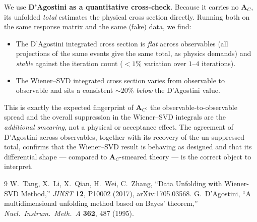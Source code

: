 \documentclass[11pt]{article}
\newcommand{\AC}{\mathbf{A}_C}
\begin{document}
We use \textbf{D'Agostini as a quantitative cross-check}. Because it carries no $\AC$,
its unfolded \emph{total} estimates the physical cross section directly. Running both on
the same response matrix and the same (fake) data, we find:
\begin{itemize}[noitemsep]
  \item The D'Agostini integrated cross section is \emph{flat} across observables (all
    projections of the same events give the same total, as physics demands) and
    \emph{stable} against the iteration count ($<1\%$ variation over $1$--$4$
    iterations).
  \item The Wiener--SVD integrated cross section varies from observable to observable and
    sits a consistent $\sim\!20\%$ \emph{below} the D'Agostini value.
\end{itemize}
This is exactly the expected fingerprint of $\AC$: the observable-to-observable spread
and the overall suppression in the Wiener--SVD integrals are the \emph{additional
smearing}, not a physical or acceptance effect. The agreement of D'Agostini across
observables, together with its recovery of the un-suppressed total, confirms that the
Wiener--SVD result is behaving as designed and that its differential shape --- compared
to $\AC$-smeared theory --- is the correct object to interpret.

\begin{thebibliography}{9}
 W.~Tang, X.~Li, X.~Qian, H.~Wei, C.~Zhang,
  ``Data Unfolding with Wiener-SVD Method,''
  \emph{JINST} \textbf{12}, P10002 (2017), arXiv:1705.03568.
 G.~D'Agostini,
  ``A multidimensional unfolding method based on Bayes' theorem,''
  \emph{Nucl.\ Instrum.\ Meth.\ A} \textbf{362}, 487 (1995).
\end{thebibliography}
\end{document}
